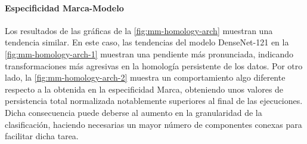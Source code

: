 \paragraph{Especificidad Marca-Modelo}

Los resultados de las gráficas de la \autoref{fig:mm-homology-arch} muestran una
tendencia similar. En este caso, las tendencias del modelo DenseNet-121 en la
\autoref{fig:mm-homology-arch-1} muestran una pendiente más pronunciada, indicando
transformaciones más agresivas en la homología persistente de los datos. Por
otro lado, la \autoref{fig:mm-homology-arch-2} muestra un comportamiento algo diferente
respecto a la obtenida en la especificidad Marca, obteniendo unos valores de
persistencia total normalizada notablemente superiores al final de las
ejecuciones. Dicha consecuencia puede deberse al aumento en la granularidad de la
clasificación, haciendo necesarias un mayor número de componentes conexas para
facilitar dicha tarea.

